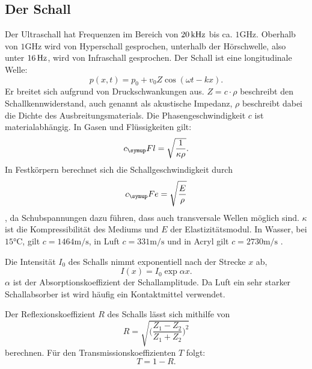\subsection{Der Schall}
Der Ultraschall hat Frequenzen im Bereich von $20 \,\si{\kilo\hertz}$ bis ca. $1 \si{\giga\hertz}$.
Oberhalb von $1 \si{\giga\hertz}$ wird von Hyperschall gesprochen, unterhalb der Hörschwelle,
also unter $16 \,\si{\hertz}$, wird von Infraschall gesprochen.
Der Schall ist eine longitudinale Welle:
\begin{equation}
  p(x,t)= p_0 + v_0 Z \cos{(\omega t -kx)}.
\end{equation}
Er breitet sich aufgrund von Druckschwankungen aus. $Z= c \cdot \rho$ beschreibt
den Schallkennwiderstand, auch genannt als akustische Impedanz, $\rho$ beschreibt
dabei die Dichte des Ausbreitungsmaterials. Die Phasengeschwindigkeit $c$ ist
materialabhängig. In Gasen und Flüssigkeiten gilt:
\begin{equation}
  c_\su{Fl} = \sqrt{\frac{1}{\kappa \rho}}.
\end{equation}
In Festkörpern berechnet sich die Schallgeschwindigkeit durch
\begin{equation}
  c_\su{Fe}= \sqrt{\frac{E}{\rho}}
\end{equation}
, da Schubspannungen dazu führen, dass auch transversale Wellen möglich sind.
$\kappa$ ist die Kompressibilität des Mediums und $E$ der Elastizitätsmodul.
In Wasser, bei $15 \si{\celsius}$, gilt $c = 1464 \si{\meter\per\second}$,
in Luft $c = 331 \si{\meter\per\second}$ \cite{spektrum} und in Acryl
gilt $c = 2730 \si{\meter\per\second}$ \cite{olympus}.

Die Intensität $I_0$ des Schalls nimmt exponentiell nach der Strecke $x$ ab,
\begin{equation}
  I(x) = I_0 \exp{\alpha x}.
\end{equation}
$\alpha$ ist der Absorptionskoeffizient der Schallamplitude. Da Luft ein sehr
starker Schallabsorber ist wird häufig ein Kontaktmittel verwendet.

Der Reflexionskoeffizient $R$ des Schalls lässt sich mithilfe von
\begin{equation}
  R = \sqrt{\Bigg(\frac{Z_1 - Z_2}{Z_1 + Z_2}\Bigg)^2}
\end{equation}
berechnen. Für den Transmissionskoeffizienten $T$ folgt:
\begin{equation}
  T = 1-R.
\end{equation}

